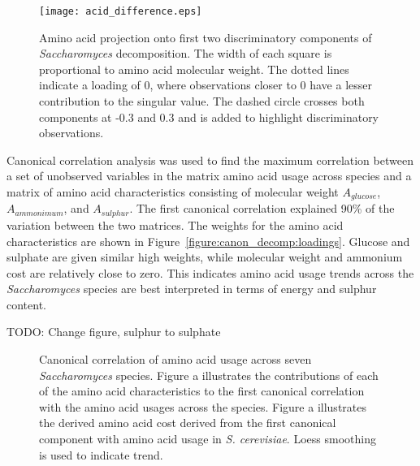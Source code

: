 \begin{figure}
  \centering
  \texttt{[image: acid\_difference.eps]}
  \caption[Amino acid projection onto first two discriminatory components of \emph{Saccharomyces} decomposition]{Amino acid projection onto first two discriminatory components of \emph{Saccharomyces} decomposition. The width of each square is proportional to amino acid molecular weight. The dotted lines indicate a loading of 0, where observations closer to 0 have a lesser contribution to the singular value. The dashed circle crosses both components at -0.3 and 0.3 and is added to highlight discriminatory observations.}
  \label{figure:acid_decomp}
\end{figure}

Canonical correlation analysis was used to find the maximum correlation between a set of unobserved variables in the matrix amino acid usage across species and a matrix of amino acid characteristics consisting of molecular weight $A_{glucose}$, $A_{ammonimum}$, and $A_{sulphur}$. The first canonical correlation explained 90\% of the variation between the two matrices. The weights for the amino acid characteristics are shown in Figure~\vref{figure:canon_decomp:loadings}. Glucose and sulphate are given similar high weights, while molecular weight and ammonium cost are relatively close to zero. This indicates amino acid usage trends across the \emph{Saccharomyces} species are best interpreted in terms of energy and sulphur content.

TODO: Change figure, sulphur to sulphate

\begin{figure}
  \centering
  \vfill
  \caption[Canonical correlation of amino acid usage]{Canonical correlation of amino acid usage across seven \emph{Saccharomyces} species. Figure a illustrates the contributions of each of the amino acid characteristics to the first canonical correlation with the amino acid usages across the species. Figure a illustrates the derived amino acid cost derived from the first canonical component with amino acid usage in \emph{S. cerevisiae}. Loess smoothing is used to indicate trend.}
  \label{figure:canon_decomp}
\end{figure}

